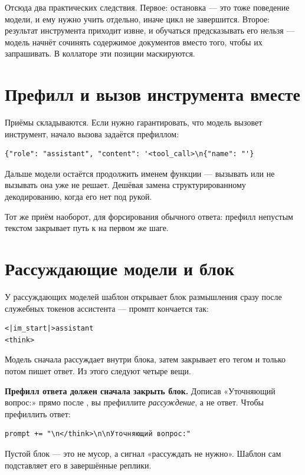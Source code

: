 \documentclass[11pt,a4paper]{article}
\begin{document}
Отсюда два практических следствия. Первое: остановка — это тоже
поведение модели, и ему нужно учить отдельно, иначе цикл не завершится.
Второе: результат инструмента приходит извне, и обучаться предсказывать
его нельзя — модель начнёт сочинять содержимое документов вместо того,
чтобы их запрашивать. В коллаторе эти позиции маскируются.

\section{Префилл и вызов инструмента вместе}

Приёмы складываются. Если нужно гарантировать, что модель вызовет
инструмент, начало вызова задаётся префиллом:

\begin{Verbatim}
{"role": "assistant", "content": '<tool_call>\n{"name": "'}
\end{Verbatim}

Дальше модели остаётся продолжить именем функции — вызывать или
не вызывать она уже не решает. Дешёвая замена структурированному
декодированию, когда его нет под рукой.

Тот же приём наоборот, для форсирования обычного ответа: префилл
непустым текстом закрывает путь к  на первом же шаге.

\section{Рассуждающие модели и блок }

У рассуждающих моделей шаблон открывает блок размышления сразу после
служебных токенов ассистента — промпт кончается так:

\begin{Verbatim}
<|im_start|>assistant
<think>
\end{Verbatim}

Модель сначала рассуждает внутри блока, затем закрывает его тегом
 и только потом пишет ответ. Из этого следуют четыре вещи.

\textbf{Префилл ответа должен сначала закрыть блок.} Дописав
«Уточняющий вопрос:» прямо после , вы префиллите
\emph{рассуждение}, а не ответ. Чтобы префиллить ответ:

\begin{Verbatim}
prompt += "\n</think>\n\nУточняющий вопрос:"
\end{Verbatim}

Пустой блок  — это
не мусор, а сигнал «рассуждать не нужно». Шаблон сам подставляет его
в завершённые реплики.
\end{document}

